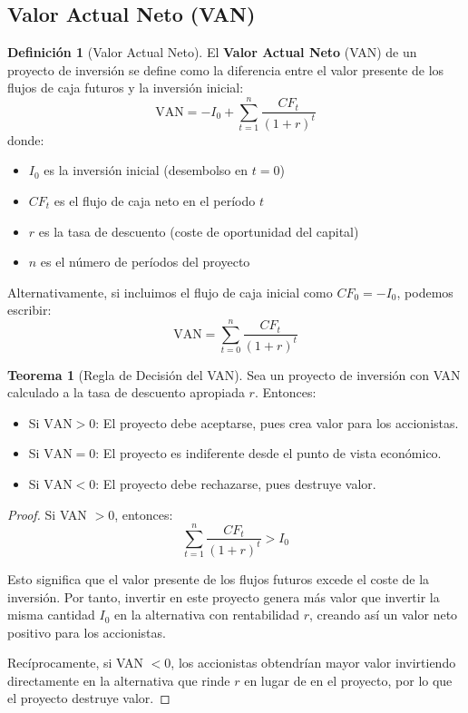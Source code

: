 \documentclass[12pt,a4paper]{article}
\theoremstyle{definition}
\newtheorem{definicion}{Definición}[section]
\newtheorem{teorema}{Teorema}[section]
\begin{document}
\subsection{Valor Actual Neto (VAN)}

\begin{definicion}[Valor Actual Neto]
El \textbf{Valor Actual Neto} (VAN) de un proyecto de inversión se define como la diferencia entre el valor presente de los flujos de caja futuros y la inversión inicial:
\begin{equation}
\text{VAN} = -I_0 + \sum_{t=1}^{n} \frac{CF_t}{(1+r)^t}
\end{equation}
donde:
\begin{itemize}
\item $I_0$ es la inversión inicial (desembolso en $t=0$)
\item $CF_t$ es el flujo de caja neto en el período $t$
\item $r$ es la tasa de descuento (coste de oportunidad del capital)
\item $n$ es el número de períodos del proyecto
\end{itemize}
\end{definicion}

Alternativamente, si incluimos el flujo de caja inicial como $CF_0 = -I_0$, podemos escribir:
\begin{equation}
\text{VAN} = \sum_{t=0}^{n} \frac{CF_t}{(1+r)^t}
\end{equation}

\begin{center}
    
\end{center}

\begin{teorema}[Regla de Decisión del VAN]
Sea un proyecto de inversión con VAN calculado a la tasa de descuento apropiada $r$. Entonces:
\begin{itemize}
\item Si $\text{VAN} > 0$: El proyecto debe aceptarse, pues crea valor para los accionistas.
\item Si $\text{VAN} = 0$: El proyecto es indiferente desde el punto de vista económico.
\item Si $\text{VAN} < 0$: El proyecto debe rechazarse, pues destruye valor.
\end{itemize}
\end{teorema}

\begin{proof}
Si VAN $> 0$, entonces:
$$\sum_{t=1}^{n} \frac{CF_t}{(1+r)^t} > I_0$$

Esto significa que el valor presente de los flujos futuros excede el coste de la inversión. Por tanto, invertir en este proyecto genera más valor que invertir la misma cantidad $I_0$ en la alternativa con rentabilidad $r$, creando así un valor neto positivo para los accionistas.

Recíprocamente, si VAN $< 0$, los accionistas obtendrían mayor valor invirtiendo directamente en la alternativa que rinde $r$ en lugar de en el proyecto, por lo que el proyecto destruye valor.
\end{proof}
\end{document}
